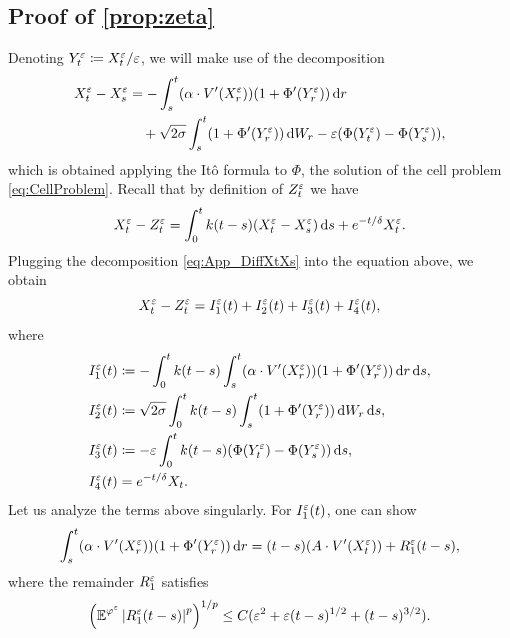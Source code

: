 \documentclass[review,onefignum,onetabnum]{siamonline190516}
\begin{document}
\begin{appendices}
\subsection{Proof of \cref{prop:zeta}}
Denoting $Y_t^\varepsilon \coloneqq X_t^\varepsilon/\varepsilon$, we will make use of the decomposition
\cite[Formula 5.8]{PaS07}
\begin{equation}\label{eq:App_DiffXtXs}
\begin{aligned}
X_t^\epl - X_s^\epl &= -\int_s^t (\alpha \cdot V'(X_r^\epl))(1 + \Phi'(Y^\epl_r)) \dd r\\
&\quad +\sqrt{2\sigma} \int_s^t (1 + \Phi'(Y_r^\epl)) \dd W_r - \epl(\Phi(Y^\epl_t)-\Phi(Y^\epl_s)),
\end{aligned}
\end{equation}
which is obtained applying the Itô formula to $\Phi$, the solution of the cell problem \eqref{eq:CellProblem}. Recall that by definition of $Z_t^\varepsilon$ we have
	\begin{equation}
	X_t^\varepsilon - Z_t^\varepsilon = \int_0^t k(t-s) (X_t^\varepsilon - X_s^\varepsilon) \,\mathrm{d} s + e^{-t/\delta}X_t^\varepsilon.
	\end{equation}
	Plugging the decomposition \eqref{eq:App_DiffXtXs} into the equation above, we obtain
	\begin{equation}
	X_t^\varepsilon - Z_t^\varepsilon = I_1^\varepsilon(t) + I_2^\varepsilon(t) + I_3^\varepsilon(t) + I_4^\varepsilon(t),
	\end{equation}
	where
	\begin{equation}
	\begin{aligned}
	I_1^\varepsilon(t) &\coloneqq -\int_0^t k(t-s)\int_s^t (\alpha \cdot V'(X_r^\varepsilon))(1 + \Phi'(Y^\varepsilon_r)) \,\mathrm{d} r \,\mathrm{d} s,\\
	I_2^\varepsilon(t) &\coloneqq \sqrt{2\sigma}\int_0^t k(t-s) \int_s^t (1 + \Phi'(Y_r^\varepsilon)) \,\mathrm{d} W_r \,\mathrm{d} s, \\
	I_3^\varepsilon(t) &\coloneqq - \varepsilon \int_0^t k(t-s)(\Phi(Y^\varepsilon_t)-\Phi(Y^\varepsilon_s)) \,\mathrm{d} s,\\
	I_4^\varepsilon(t) &= e^{-t / \delta}X_t.
	\end{aligned}
	\end{equation}
	Let us analyze the terms above singularly. For $I_1^\varepsilon(t)$, one can show \cite[Proposition 5.8]{PaS07}
	\begin{equation}
	\int_s^t (\alpha \cdot V'(X_r^\varepsilon)) (1 + \Phi'(Y^\varepsilon_r)) \,\mathrm{d} r = (t - s)(A \cdot V'(X_t^\varepsilon)) + R_1^\varepsilon(t-s),
	\end{equation}
	where the remainder $R_1^\varepsilon$ satisfies 
	\begin{equation}\label{eq:FirstTermPavStu}
	\left(\E^{\phi^\epl}\abs{R_1^\epl(t-s)}^p\right)^{1/p} \leq C(\epl^2 + \epl(t-s)^{1/2}+(t-s)^{3/2}).

\end{equation}
\end{appendices}
\end{document}
